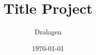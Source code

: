 \documentclass[pdftex,12pt,a4paper]{article}
\title{Title Project}
\author{Dralagen}
\date{\today}
\begin{document}
\maketitle
\lipsum
\end{document}
